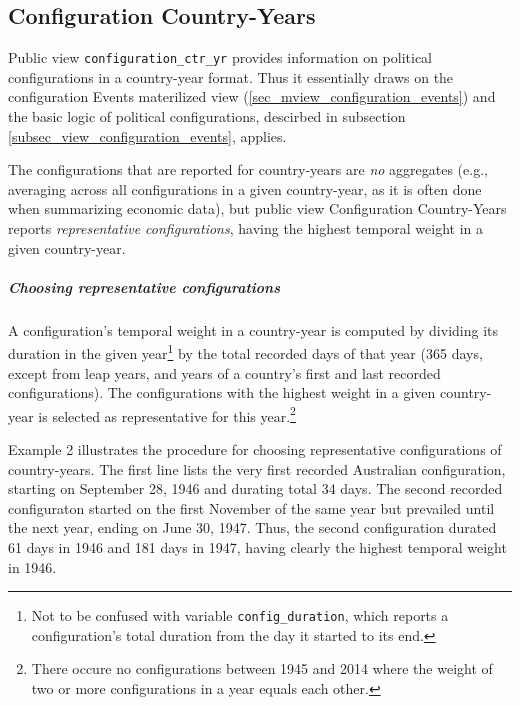 \subsection{Configuration Country-Years}\label{subsec_pview_configuration_ctr_yr}
Public view \texttt{\footnotesize configuration\_ctr\_yr} provides information on political configurations in a country-year format. Thus it essentially draws on the configuration Events materilized view (\ref{sec_mview_configuration_events}) and the basic logic of political configurations, descirbed in subsection \ref{subsec_view_configuration_events}, applies. 

The configurations that are reported for country-years are {\em no} aggregates (e.g., averaging across all configurations in a given country-year, as it is often done when summarizing economic data),
but public view Configuration Country-Years reports {\em representative configurations}, having the highest temporal weight in a given country-year. 

\subparagraph{Choosing representative configurations}\label{choosing_rep_configs}
A configuration's temporal weight in a country-year is computed by dividing its duration in the given year\footnote{Not to be confused with variable \texttt{\smallfont config\_duration}, which reports a configuration's total duration from the day it started to its end.} by the total recorded days of that year (365 days, except from leap years, and years of a country's first and last recorded configurations).
The configurations with the highest weight in a given country-year is selected as representative for this year.\footnote{There occure no configurations between 1945 and 2014 where the weight of two or more configurations in a year equals each other.\label{fn_uniqness_of_weights_in_ctr_yrs}%
}
\begin{table}[h!]
\centering\footnotesize
\caption*{Example 2: Duration and temporal weight of configurations in Australia, 1946 to 1949.}

\end{table}

Example 2 illustrates the procedure for choosing representative configurations of country-years.
The first line lists the very first recorded Australian configuration, starting on September 28, 1946 and durating total 34 days. 
The second recorded configuraton started on the first November of the same year but prevailed until the next year, ending on June 30, 1947. Thus, the second configuration durated 61 days in 1946 and 181 days in 1947, having clearly the highest temporal weight in 1946.

